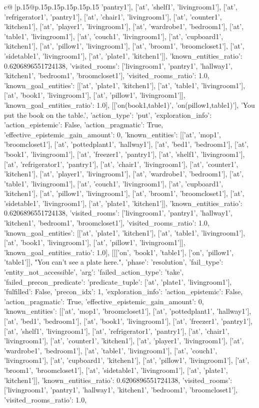 \documentclass{article}
\begin{document}
{\begin{supertabular}{c@{$\;$}|p{.15\linewidth}@{}p{.15\linewidth}p{.15\linewidth}p{.15\linewidth}p{.15\linewidth}p{.15\linewidth}}
{{{'pantry1'], ['at', 'shelf1', 'livingroom1'], ['at', 'refrigerator1', 'pantry1'], ['at', 'chair1', 'livingroom1'], ['at', 'counter1', 'kitchen1'], ['at', 'player1', 'livingroom1'], ['at', 'wardrobe1', 'bedroom1'], ['at', 'table1', 'livingroom1'], ['at', 'couch1', 'livingroom1'], ['at', 'cupboard1', 'kitchen1'], ['at', 'pillow1', 'livingroom1'], ['at', 'broom1', 'broomcloset1'], ['at', 'sidetable1', 'livingroom1'], ['at', 'plate1', 'kitchen1']], 'known_entities_ratio': 0.6206896551724138, 'visited_rooms': ['livingroom1', 'pantry1', 'hallway1', 'kitchen1', 'bedroom1', 'broomcloset1'], 'visited_rooms_ratio': 1.0, 'known_goal_entities': [['at', 'plate1', 'kitchen1'], ['at', 'table1', 'livingroom1'], ['at', 'book1', 'livingroom1'], ['at', 'pillow1', 'livingroom1']], 'known_goal_entities_ratio': 1.0}}], [['on(book1,table1)', 'on(pillow1,table1)'], 'You put the book on the table.', {'action_type': 'put', 'exploration_info': {'action_epistemic': False, 'action_pragmatic': True, 'effective_epistemic_gain_amount': 0, 'known_entities': [['at', 'mop1', 'broomcloset1'], ['at', 'pottedplant1', 'hallway1'], ['at', 'bed1', 'bedroom1'], ['at', 'book1', 'livingroom1'], ['at', 'freezer1', 'pantry1'], ['at', 'shelf1', 'livingroom1'], ['at', 'refrigerator1', 'pantry1'], ['at', 'chair1', 'livingroom1'], ['at', 'counter1', 'kitchen1'], ['at', 'player1', 'livingroom1'], ['at', 'wardrobe1', 'bedroom1'], ['at', 'table1', 'livingroom1'], ['at', 'couch1', 'livingroom1'], ['at', 'cupboard1', 'kitchen1'], ['at', 'pillow1', 'livingroom1'], ['at', 'broom1', 'broomcloset1'], ['at', 'sidetable1', 'livingroom1'], ['at', 'plate1', 'kitchen1']], 'known_entities_ratio': 0.6206896551724138, 'visited_rooms': ['livingroom1', 'pantry1', 'hallway1', 'kitchen1', 'bedroom1', 'broomcloset1'], 'visited_rooms_ratio': 1.0, 'known_goal_entities': [['at', 'plate1', 'kitchen1'], ['at', 'table1', 'livingroom1'], ['at', 'book1', 'livingroom1'], ['at', 'pillow1', 'livingroom1']], 'known_goal_entities_ratio': 1.0}}], [[['on', 'book1', 'table1'], ['on', 'pillow1', 'table1']], "You can't see a plate here.", {'phase': 'resolution', 'fail_type': 'entity_not_accessible', 'arg': {'failed_action_type': 'take', 'failed_precon_predicate': {'predicate_tuple': ['at', 'plate1', 'livingroom1'], 'fulfilled': False, 'precon_idx': 1}}, 'exploration_info': {'action_epistemic': False, 'action_pragmatic': True, 'effective_epistemic_gain_amount': 0, 'known_entities': [['at', 'mop1', 'broomcloset1'], ['at', 'pottedplant1', 'hallway1'], ['at', 'bed1', 'bedroom1'], ['at', 'book1', 'livingroom1'], ['at', 'freezer1', 'pantry1'], ['at', 'shelf1', 'livingroom1'], ['at', 'refrigerator1', 'pantry1'], ['at', 'chair1', 'livingroom1'], ['at', 'counter1', 'kitchen1'], ['at', 'player1', 'livingroom1'], ['at', 'wardrobe1', 'bedroom1'], ['at', 'table1', 'livingroom1'], ['at', 'couch1', 'livingroom1'], ['at', 'cupboard1', 'kitchen1'], ['at', 'pillow1', 'livingroom1'], ['at', 'broom1', 'broomcloset1'], ['at', 'sidetable1', 'livingroom1'], ['at', 'plate1', 'kitchen1']], 'known_entities_ratio': 0.6206896551724138, 'visited_rooms': ['livingroom1', 'pantry1', 'hallway1', 'kitchen1', 'bedroom1', 'broomcloset1'], 'visited_rooms_ratio': 1.0, }}}
\end{supertabular}}
\end{document}

